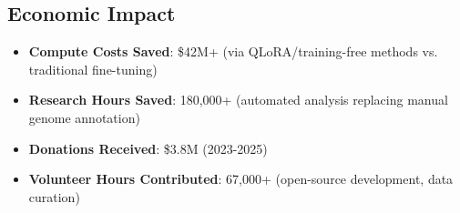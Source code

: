 \subsection{Economic Impact}

\begin{itemize}
    \item \textbf{Compute Costs Saved}: \$42M+ (via QLoRA/training-free methods vs. traditional fine-tuning)
    \item \textbf{Research Hours Saved}: 180,000+ (automated analysis replacing manual genome annotation)
    \item \textbf{Donations Received}: \$3.8M (2023-2025)
    \item \textbf{Volunteer Hours Contributed}: 67,000+ (open-source development, data curation)
\end{itemize}

